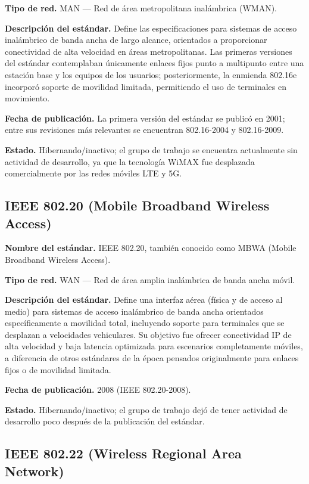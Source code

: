 \documentclass[12pt,letterpaper]{article}
\begin{document}
\textbf{Tipo de red.} MAN — Red de área metropolitana inalámbrica (WMAN).

\textbf{Descripción del estándar.} Define las especificaciones para sistemas de acceso inalámbrico de banda ancha de largo alcance, orientados a proporcionar conectividad de alta velocidad en áreas metropolitanas. Las primeras versiones del estándar contemplaban únicamente enlaces fijos punto a multipunto entre una estación base y los equipos de los usuarios; posteriormente, la enmienda 802.16e incorporó soporte de movilidad limitada, permitiendo el uso de terminales en movimiento.

\textbf{Fecha de publicación.} La primera versión del estándar se publicó en 2001; entre sus revisiones más relevantes se encuentran 802.16-2004 y 802.16-2009.

\textbf{Estado.} Hibernando/inactivo; el grupo de trabajo se encuentra actualmente sin actividad de desarrollo, ya que la tecnología WiMAX fue desplazada comercialmente por las redes móviles LTE y 5G.

\subsection{IEEE 802.20 (Mobile Broadband Wireless Access)}

\textbf{Nombre del estándar.} IEEE 802.20, también conocido como MBWA (Mobile Broadband Wireless Access).

\textbf{Tipo de red.} WAN — Red de área amplia inalámbrica de banda ancha móvil.

\textbf{Descripción del estándar.} Define una interfaz aérea (física y de acceso al medio) para sistemas de acceso inalámbrico de banda ancha orientados específicamente a movilidad total, incluyendo soporte para terminales que se desplazan a velocidades vehiculares. Su objetivo fue ofrecer conectividad IP de alta velocidad y baja latencia optimizada para escenarios completamente móviles, a diferencia de otros estándares de la época pensados originalmente para enlaces fijos o de movilidad limitada.

\textbf{Fecha de publicación.} 2008 (IEEE 802.20-2008).

\textbf{Estado.} Hibernando/inactivo; el grupo de trabajo dejó de tener actividad de desarrollo poco después de la publicación del estándar.

\subsection{IEEE 802.22 (Wireless Regional Area Network)}
\end{document}
